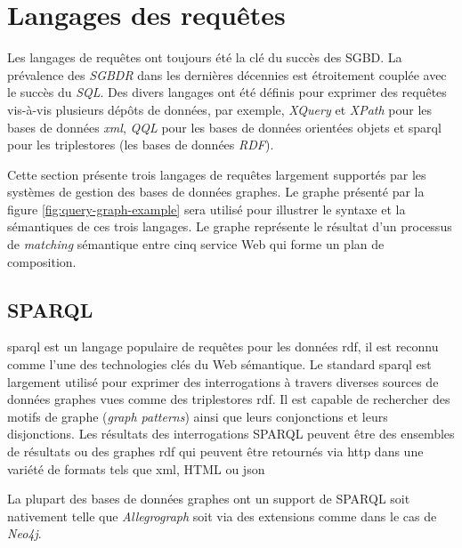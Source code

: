 \section{Langages des requêtes}
\label{sec:query-languages}

Les langages de requêtes ont toujours été la clé du succès des
\acrshort{SGBD}. La prévalence des \emph{\acrshort{SGBDR}} dans les
dernières décennies est étroitement couplée avec le succès du
\emph{SQL}. Des divers langages ont été définis pour exprimer des
requêtes vis-à-vis plusieurs dépôts de données, par exemple,
\emph{XQuery} \cite{boag2002xquery} et \emph{XPath}
\cite{clark1999xml} pour les bases de données \emph{\acrshort{xml}},
\emph{QQL} \cite{alashqur1989oql} pour les bases de données orientées
objets et \acrshort{sparql} \cite{prud2008sparql} pour les
triplestores (les bases de données \emph{RDF}).



Cette section présente trois langages de requêtes largement supportés
par les systèmes de gestion des bases de données graphes. Le graphe
présenté par la figure \ref{fig:query-graph-example} sera utilisé pour
illustrer le syntaxe et la sémantiques de ces trois langages. Le
graphe représente le résultat d'un processus de \emph{matching}
sémantique entre cinq service Web qui forme un plan de composition.



  \subsection{SPARQL}
  \label{sec:sparql}

  \acrshort{sparql} \cite{prud2008sparql} est un langage populaire de
  requêtes pour les données \acrshort{rdf}, il est reconnu comme l'une
  des technologies clés du Web sémantique. Le standard
  \acrshort{sparql} est largement utilisé pour exprimer des
  interrogations à travers diverses sources de données graphes vues
  comme des triplestores \acrshort{rdf}. Il est capable de rechercher
  des motifs de graphe (\emph{graph patterns}) ainsi que leurs
  conjonctions et leurs disjonctions. Les résultats des interrogations
  \textsc{SPARQL} peuvent être des ensembles de résultats ou des
  graphes \acrshort{rdf} qui peuvent être retournés via
  \acrshort{http} dans une variété de formats tels que \acrshort{xml},
  HTML ou \acrshort{json}

  La plupart des bases de données graphes ont un support de
  \textsc{SPARQL} soit nativement telle que \emph{Allegrograph} soit
  via des extensions comme dans le cas de \emph{Neo4j}.

